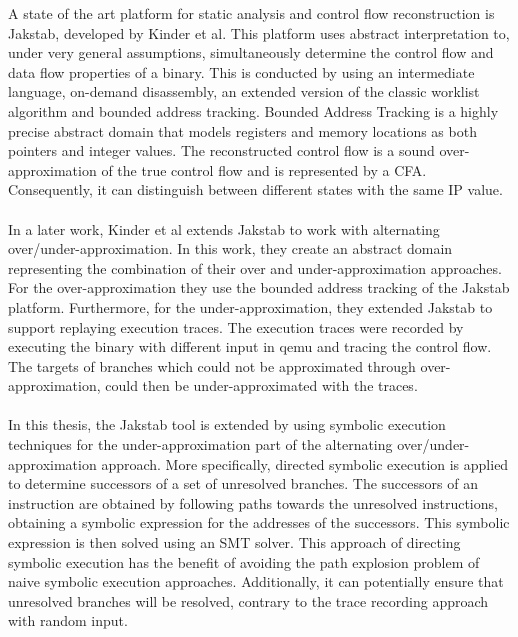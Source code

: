 \documentclass{kththesis}
\begin{document}
A state of the art platform for static analysis and control flow reconstruction is Jakstab\cite{JakstabGit}, developed by Kinder et al\cite{Jakstab}. This platform uses abstract interpretation to, under very general assumptions, simultaneously determine the control flow and data flow properties of a binary. This is conducted by using an intermediate language, on-demand disassembly, an extended version of the classic worklist algorithm and bounded address tracking. Bounded Address Tracking is a highly precise abstract domain that models registers and memory locations as both pointers and integer values. The reconstructed control flow is a sound over-approximation of the true control flow and is represented by a CFA. Consequently, it can distinguish between different states with the same IP value.
\\ \\
In a later work, Kinder et al extends Jakstab to work with alternating over/under-approximation\cite{alternating}. In this work, they create an abstract domain representing the combination of their over and under-approximation approaches. For the over-approximation they use the bounded address tracking of the Jakstab platform. Furthermore, for the under-approximation, they extended Jakstab to support replaying execution traces. The execution traces were recorded by executing the binary with different input in qemu and tracing the control flow. The targets of branches which could not be approximated through over-approximation, could then be under-approximated with the traces. 
\\ \\
In this thesis, the Jakstab tool is extended by using symbolic execution techniques for the under-approximation part of the alternating over/under-approximation approach. More specifically, directed symbolic execution is applied to determine successors of a set of unresolved branches. The successors of an instruction are obtained by following paths towards the unresolved instructions, obtaining a symbolic expression for the addresses of the successors. This symbolic expression is then solved using an SMT solver. This approach of directing symbolic execution has the benefit of avoiding the path explosion problem of naive symbolic execution approaches. Additionally, it can potentially ensure that unresolved branches will be resolved, contrary to the trace recording approach with random input.
\end{document}
